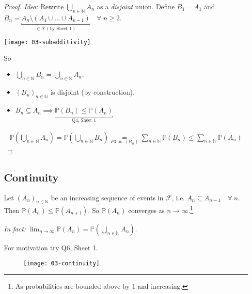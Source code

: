 \begin{proof}
    \emph{Idea}: Rewrite $\bigcup_{n \in \mathbb{N}} A_n$ as a \emph{disjoint} union.
    Define $B_1 = A_1$ and $B_n = \underbracket{A_n \setminus (A_1\cup \dots \cup A_{n-1})}_{\in \mathcal{F} (\text{by Sheet 1})}\quad \forall \; n \geq 2$.
    {\par \centering \texttt{[image: 03-subadditivity]} \par}
    So
    \begin{itemize}
        \item $\bigcup_{n \in \mathbb{N}} B_n = \bigcup_{n \in \mathbb{N}} A_n$.
        \item $(B_n)_{n \in \mathbb{N}}$ is disjoint (by construction).
        \item $B_n \subseteq A_n \implies \underbracket{\mathbb{P}(B_n) \leq \mathbb{P}(A_n)}_ {\text{Q4, Sheet 1}}$
    \end{itemize} 
    \begin{align*}
        \mathbb{P}\left(\bigcup_{n \in \mathbb{N}} A_n\right) = \mathbb{P}\left(\bigcup_{n \in \mathbb{N}} B_n\right) \underset{P3 \text{ on } (B_n)}{=} \sum_{n \in \mathbb{N}}  \mathbb{P}\left(B_n\right) \leq \sum_{n \in \mathbb{N}} \mathbb{P}\left(A_n\right)
    \end{align*} 
\end{proof} 

\subsection{Continuity}

\begin{proposition}[Continuity] \label{prp:continuity}
    Let $(A_n)_{n \in \mathbb{N}}$ be an increasing sequence of events in $\mathcal{F}$, i.e. $A_n \subseteq A_{n + 1} \quad \forall \; n$. 
    Then $\mathbb{P}(A_n) \leq \mathbb{P}(A_{n + 1})$.
    So $\mathbb{P}(A_n)$ converges as $n \to \infty$.\footnote{As probabilities are bounded above by 1 and increasing.}

    \emph{In fact:} $\lim_{n \to \infty} \mathbb{P}(A_n) = \mathbb{P} \left(\bigcup_{n \in \mathbb{N}} A_n \right)$.
\end{proposition} 

For motivation try Q6, Sheet 1.

\begin{figure}[h] 
    \centering 
    \texttt{[image: 03-continuity]} 
\end{figure}

